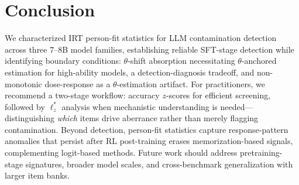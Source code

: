 \section{Conclusion}\label{sec:conclusion}

We characterized IRT person-fit statistics for LLM contamination detection across three 7--8B model families, establishing reliable SFT-stage detection while identifying boundary conditions: $\theta$-shift absorption necessitating $\theta$-anchored estimation for high-ability models, a detection-diagnosis tradeoff, and non-monotonic dose-response as a $\theta$-estimation artifact.
For practitioners, we recommend a two-stage workflow: accuracy $z$-scores for efficient screening, followed by $\ell_z^*$ analysis when mechanistic understanding is needed---distinguishing \emph{which} items drive aberrance rather than merely flagging contamination.
Beyond detection, person-fit statistics capture response-pattern anomalies that persist after RL post-training erases memorization-based signals, complementing logit-based methods.
Future work should address pretraining-stage signatures, broader model scales, and cross-benchmark generalization with larger item banks.
